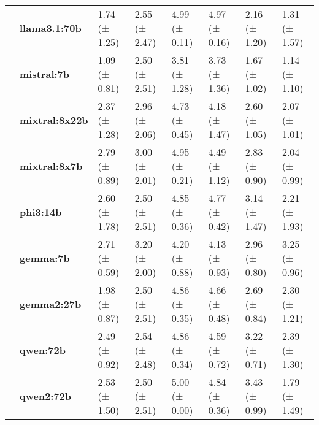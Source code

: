 \begin{longtable}{llllllll}
\textbf{} & \textbf{llama3.1:70b} & 1.74 (± 1.25) & 2.55 (± 2.47) & 4.99 (± 0.11) & 4.97 (± 0.16) & 2.16 (± 1.20) & 1.31 (± 1.57) \\
\textbf{} & \textbf{mistral:7b} & 1.09 (± 0.81) & 2.50 (± 2.51) & 3.81 (± 1.28) & 3.73 (± 1.36) & 1.67 (± 1.02) & 1.14 (± 1.10) \\
\textbf{} & \textbf{mixtral:8x22b} & 2.37 (± 1.28) & 2.96 (± 2.06) & 4.73 (± 0.45) & 4.18 (± 1.47) & 2.60 (± 1.05) & 2.07 (± 1.01) \\
\textbf{} & \textbf{mixtral:8x7b} & 2.79 (± 0.89) & 3.00 (± 2.01) & 4.95 (± 0.21) & 4.49 (± 1.12) & 2.83 (± 0.90) & 2.04 (± 0.99) \\
\textbf{} & \textbf{phi3:14b} & 2.60 (± 1.78) & 2.50 (± 2.51) & 4.85 (± 0.36) & 4.77 (± 0.42) & 3.14 (± 1.47) & 2.21 (± 1.93) \\
\textbf{} & \textbf{gemma:7b} & 2.71 (± 0.59) & 3.20 (± 2.00) & 4.20 (± 0.88) & 4.13 (± 0.93) & 2.96 (± 0.80) & 3.25 (± 0.96) \\
\textbf{} & \textbf{gemma2:27b} & 1.98 (± 0.87) & 2.50 (± 2.51) & 4.86 (± 0.35) & 4.66 (± 0.48) & 2.69 (± 0.84) & 2.30 (± 1.21) \\
\textbf{} & \textbf{qwen:72b} & 2.49 (± 0.92) & 2.54 (± 2.48) & 4.86 (± 0.34) & 4.59 (± 0.72) & 3.22 (± 0.71) & 2.39 (± 1.30) \\
\textbf{} & \textbf{qwen2:72b} & 2.53 (± 1.50) & 2.50 (± 2.51) & 5.00 (± 0.00) & 4.84 (± 0.36) & 3.43 (± 0.99) & 1.79 (± 1.49) \\
\cline{1-8}
\end{longtable}

